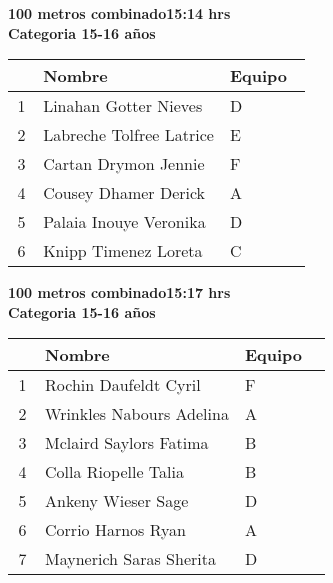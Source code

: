 \begin{minipage}{0.95\linewidth}\vspace{0.5cm} 
\begin{flushleft}
\textbf{
\hspace{-0.15cm}100 metros combinado\hspace{1.5cm}15:14 hrs \\Categoria 15-16 años}\vspace{-0.2cm} 
\end{flushleft}
\begin{tabular}{cp{0.63\linewidth}l}
\hline
& \textbf{Nombre} & \textbf{Equipo} \\ \hline
1 & Linahan Gotter Nieves & D \\ 
2 & Labreche Tolfree Latrice & E \\ 
3 & Cartan Drymon Jennie & F \\ 
4 & Cousey Dhamer Derick & A \\ 
5 & Palaia Inouye Veronika & D \\ 
6 & Knipp Timenez Loreta & C \\ 
\end{tabular}
\end{minipage}
\begin{minipage}{0.95\linewidth}\vspace{0.5cm} 
\begin{flushleft}
\textbf{
\hspace{-0.15cm}100 metros combinado\hspace{1.5cm}15:17 hrs \\Categoria 15-16 años}\vspace{-0.2cm} 
\end{flushleft}
\begin{tabular}{cp{0.63\linewidth}l}
\hline
& \textbf{Nombre} & \textbf{Equipo} \\ \hline
1 & Rochin Daufeldt Cyril & F \\ 
2 & Wrinkles Nabours Adelina & A \\ 
3 & Mclaird Saylors Fatima & B \\ 
4 & Colla Riopelle Talia & B \\ 
5 & Ankeny Wieser Sage & D \\ 
6 & Corrio Harnos Ryan & A \\ 
7 & Maynerich Saras Sherita & D \\ 
\end{tabular}
\end{minipage}
